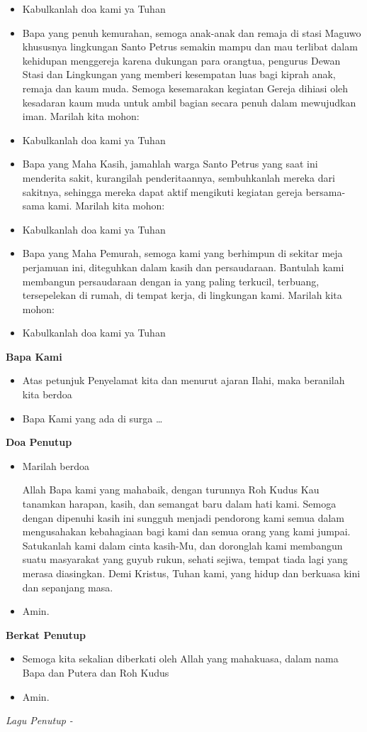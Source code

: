 \documentclass[a4paper,12pt]{scrartcl}
\makeatletter
\newcommand{\subjudul}[1]{%
  {\parindent \z@ 
    \interlinepenalty\@M \bfseries #1\par\nobreak \vskip 10\p@ }}
\newcommand{\lagu}[1]{%
  {\parindent \z@ 
    \interlinepenalty\@M \slshape \mdseries \Large \textsl{#1}\par\nobreak \vskip 20\p@ }}
\newcommand{\BU}[1]{\begin{itemize} \item[U:] #1 \end{itemize}}
\newcommand{\BP}[1]{\begin{itemize} \item[P:] #1 \end{itemize}}
\newcommand{\lagupenutup}{~}
\makeatother
\begin{document}
\BU{Kabulkanlah doa kami ya Tuhan}

\BP{Bapa yang penuh kemurahan, semoga anak-anak dan remaja di stasi Maguwo
khususnya lingkungan Santo Petrus semakin mampu dan mau terlibat dalam kehidupan
menggereja karena dukungan para orangtua, pengurus Dewan Stasi dan Lingkungan yang
memberi kesempatan luas bagi kiprah anak, remaja dan kaum muda.  Semoga kesemarakan
kegiatan Gereja dihiasi oleh kesadaran kaum muda untuk ambil bagian secara penuh
dalam mewujudkan iman.  
Marilah kita mohon:}

\BU{Kabulkanlah doa kami ya Tuhan}

\BP{Bapa yang Maha Kasih, jamahlah warga Santo Petrus yang saat ini menderita
sakit, kurangilah penderitaannya, sembuhkanlah mereka dari sakitnya, sehingga mereka
dapat aktif mengikuti kegiatan gereja bersama-sama kami. Marilah kita mohon:}

\BU{Kabulkanlah doa kami ya Tuhan}

\BP{Bapa yang Maha Pemurah, semoga kami yang berhimpun di sekitar meja perjamuan
ini, diteguhkan dalam kasih dan persaudaraan. Bantulah kami  membangun persaudaraan
dengan ia yang paling terkucil, terbuang, tersepelekan di rumah, di tempat kerja, di
lingkungan kami.
Marilah kita mohon:}

\BU{Kabulkanlah doa kami ya Tuhan}

\subjudul{Bapa Kami}
\BP{Atas petunjuk Penyelamat kita dan menurut ajaran Ilahi, maka beranilah
kita berdoa}

\BU{Bapa Kami yang ada di surga \dots}


\subjudul{Doa Penutup}
\BP{Marilah berdoa

Allah Bapa kami yang mahabaik, dengan turunnya Roh Kudus Kau tanamkan harapan, kasih, dan semangat baru dalam hati kami. Semoga dengan dipenuhi kasih ini sungguh menjadi pendorong kami semua dalam mengusahakan kebahagiaan bagi kami dan semua orang yang kami jumpai. Satukanlah kami dalam cinta kasih-Mu, dan doronglah kami membangun suatu masyarakat yang guyub rukun, sehati sejiwa, tempat tiada lagi yang merasa diasingkan. Demi Kristus, Tuhan kami, yang hidup dan berkuasa kini dan sepanjang masa.}
\BU{Amin.}

\subjudul{Berkat Penutup}
\BP{Semoga kita sekalian diberkati oleh Allah yang mahakuasa, dalam nama Bapa dan
Putera dan Roh Kudus}
\BU{Amin.}

\lagu{Lagu Penutup - \lagupenutup}
\end{document}
